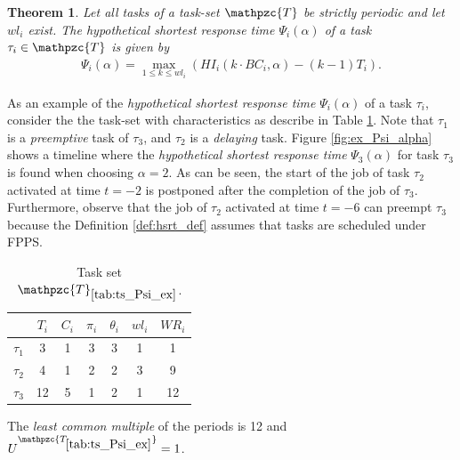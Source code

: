\documentclass[fleqn]{article}
\newtheorem{theorem}{Theorem}
\begin{document}


\begin{theorem}
	Let all tasks of a task-set $\mathpzc{T}$ be strictly periodic and let $wl_i$ exist. The \textit{hypothetical shortest response time} $\Psi_i(\alpha)$ of a task $\tau_i \in \mathpzc{T}$ is given by
	\begin{align}
	\Psi_i(\alpha) = \max \limits_{1 \leq k \leq wl_i} (HI_i(k \cdot BC_i, \alpha) - (k-1)T_i).
	\end{align}
\end{theorem}

As an example of the \textit{hypothetical shortest response time} $\Psi_i(\alpha)$ of a task $\tau_i$, consider the the task-set with characteristics as describe in Table \ref{tab:ts_Psi_ex}. Note that $\tau_1$ is a \textit{preemptive} task of $\tau_3$, and $\tau_2$ is a \textit{delaying} task. Figure \ref{fig:ex_Psi_alpha} shows a timeline where the \textit{hypothetical shortest response time} $\Psi_3(\alpha)$ for task $\tau_3$ is found when choosing $\alpha=2$. As can be seen, the start of the job of task $\tau_2$ activated at time $t=-2$ is postponed after the completion of the job of $\tau_3$. Furthermore, observe that the job of $\tau_2$ activated at time $t=-6$ can preempt $\tau_3$ because the Definition \ref{def:hsrt_def} assumes that tasks are scheduled under FPPS.

\begin{table}[H]
	\center
	\caption{Task set $\mathpzc{T}_{\ref{tab:ts_Psi_ex}}$.}
	\label{tab:ts_Psi_ex}
	\begin{tabular}{c c c c c | c c }
		\hline 
		& $T_i$ & $C_i$ & $\pi_i$ & $\theta_i$ &  $wl_i$ & $WR_i$ \\ 
		\hline 
		$\tau_1$& 3  & 1  & 3 & 3 &  1 & 1 \\ 
		$\tau_2$& 4  & 1  & 2 & 2 &  3 & 9 \\ 
		$\tau_3$& 12 & 5  & 1 & 2 &  1 & 12 \\
		\hline 
	\end{tabular}
	\small
	\item The \textit{least common multiple} of the periods is 12 and $U^{\mathpzc{T_{\ref{tab:ts_Psi_ex}}}}=1$.
\end{table}
\end{document}
